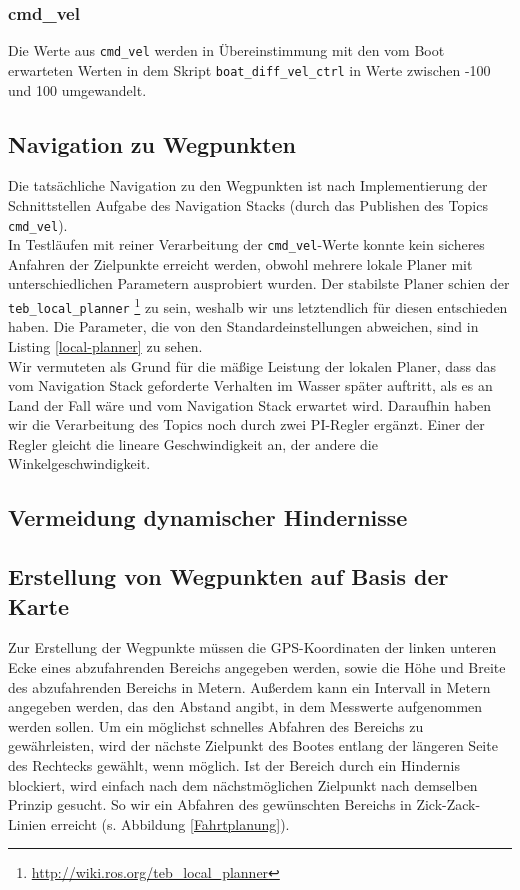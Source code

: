 \documentclass[11pt]{article}
\begin{document}
\subsubsection{cmd\_vel} \label{cmd}
Die Werte aus \texttt{cmd\_vel} werden in Übereinstimmung mit den vom Boot erwarteten Werten in dem Skript \texttt{boat\_diff\_vel\_ctrl} in Werte zwischen -100 und 100 umgewandelt.

\subsection{Navigation zu Wegpunkten}

Die tatsächliche Navigation zu den Wegpunkten ist nach Implementierung der Schnittstellen Aufgabe des Navigation Stacks (durch das Publishen des Topics \texttt{cmd\_vel}).\\
In Testläufen mit reiner Verarbeitung der \texttt{cmd\_vel}-Werte konnte kein sicheres Anfahren der Zielpunkte erreicht werden, obwohl mehrere lokale Planer mit unterschiedlichen Parametern ausprobiert wurden. Der stabilste Planer schien der \texttt{teb\_local\_planner} \footnote{\url{http://wiki.ros.org/teb_local_planner}} zu sein, weshalb wir uns letztendlich für diesen entschieden haben. Die Parameter, die von den Standardeinstellungen abweichen, sind in Listing \ref{local-planner} zu sehen.\\

Wir vermuteten als Grund für die mäßige Leistung der lokalen Planer, dass das vom Navigation Stack geforderte Verhalten im Wasser später auftritt, als es an Land der Fall wäre und vom Navigation Stack erwartet wird. Daraufhin haben wir die Verarbeitung des Topics noch durch zwei PI-Regler ergänzt. Einer der Regler gleicht die lineare Geschwindigkeit an, der andere die Winkelgeschwindigkeit.
\subsection{Vermeidung dynamischer Hindernisse}

\subsection{Erstellung von Wegpunkten auf Basis der Karte}
Zur Erstellung der Wegpunkte müssen die GPS-Koordinaten der linken unteren Ecke eines abzufahrenden Bereichs angegeben werden, sowie die Höhe und Breite des abzufahrenden Bereichs in Metern. Außerdem kann ein Intervall in Metern angegeben werden, das den Abstand angibt, in dem Messwerte aufgenommen werden sollen. Um ein möglichst schnelles Abfahren des Bereichs zu gewährleisten, wird der nächste Zielpunkt des Bootes entlang der längeren Seite des Rechtecks gewählt, wenn möglich. Ist der Bereich durch ein Hindernis blockiert, wird einfach nach dem nächstmöglichen Zielpunkt nach demselben Prinzip gesucht. So wir ein Abfahren des gewünschten Bereichs in Zick-Zack-Linien erreicht (s. Abbildung \ref{Fahrtplanung}).
\end{document}
